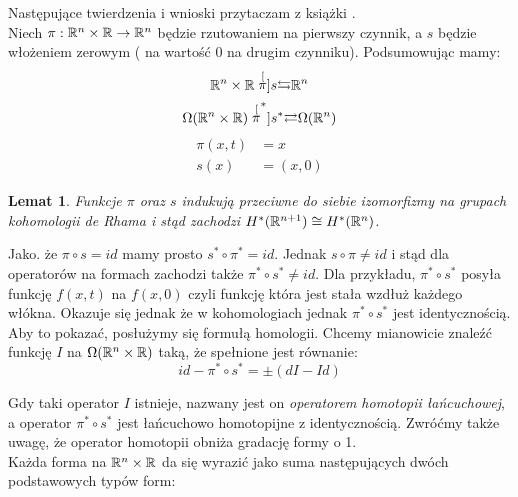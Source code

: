 \documentclass[licencjacka]{pracamgr}
\theoremstyle{definition}
\theoremstyle{definition}
\theoremstyle{plain}
\newtheorem{lemma}{Lemat}[section]
\theoremstyle{plain}
\theoremstyle{plain}
\theoremstyle{plain}
\theoremstyle{plain}
\def\R{\ensuremath\mathbb{R}}
\begin{document}
Następujące twierdzenia i wnioski przytaczam z książki \cite[Section
I.\S4, s 35]{bott}. \\

Niech $\pi: \R^n \times \R \rightarrow \R^n$  będzie rzutowaniem
na pierwszy czynnik, a $s$  będzie włożeniem zerowym (
na wartość $0$ na drugim czynniku). Podsumowując mamy:
\[
 \R^n \times \R
 \stackrel[\pi]{s}{\leftrightarrows} 
 \R^n
\]
\[
 \Omega (\R^n \times \R)
 \stackrel[\pi^\ast]{s^\ast}{\rightleftarrows} 
 \Omega(\R^n)
\]
\begin{align*}
    \pi(x, t) &= x \\
         s(x) &= (x, 0)
\end{align*}

\begin{lemma}
Funkcje $\pi$ oraz $s$ indukują przeciwne do siebie izomorfizmy na grupach
kohomologii de Rhama i stąd zachodzi $H^\ast(\R^{n+1}) \cong H^\ast(\R^{n})$.
\end{lemma}


Jako. że $\pi \circ s = id$  mamy prosto $s^\ast \circ \pi^\ast = id$. Jednak
$s \circ \pi \neq id$ i stąd dla operatorów
na formach zachodzi także $\pi^\ast \circ s^\ast \neq id$. Dla przykładu,
$\pi^\ast \circ s^\ast$ posyła funkcję $f(x, t)$ na $f(x, 0)$ czyli 
funkcję która jest stała wzdłuż każdego włókna. Okazuje się jednak
że w kohomologiach jednak $\pi^\ast \circ s^\ast$ jest identycznością.
Aby to pokazać, posłużymy się formułą homologii. Chcemy mianowicie
znaleźć funkcję $I$ na $\Omega(\R^n \times \R)$ taką, że spełnione jest
równanie:
\[
    id- \pi^\ast \circ s^\ast = \pm ( dI - Id)
\]

Gdy taki operator $I$ istnieje, nazwany jest on \emph{operatorem homotopii
łańcuchowej}, a operator $\pi^\ast \circ s^\ast$ jest łańcuchowo homotopijne z
identycznością.  Zwróćmy także uwagę, że operator homotopii obniża gradację
formy o 1. \\

Każda forma na $\R^n \times \R$ da się wyrazić jako suma następujących
dwóch podstawowych typów form:
\end{document}
